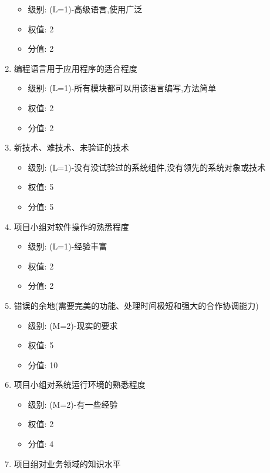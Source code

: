 \documentclass[hyperref, a4paper]{ctexart}
\providecommand{\tightlist}{%
  \setlength{\itemsep}{0pt}\setlength{\parskip}{0pt}}
\begin{document}
\begin{enumerate}
  \begin{itemize}
  \tightlist
  \item
    级别: (L=1)-高级语言,使用广泛
  \item
    权值: 2
  \item
    分值: 2
  \end{itemize}
\item
  编程语言用于应用程序的适合程度

  \begin{itemize}
  \tightlist
  \item
    级别: (L=1)-所有模块都可以用该语言编写,方法简单
  \item
    权值: 2
  \item
    分值: 2
  \end{itemize}
\item
  新技术、难技术、未验证的技术

  \begin{itemize}
  \tightlist
  \item
    级别: (L=1)-没有没试验过的系统组件,没有领先的系统对象或技术
  \item
    权值: 5
  \item
    分值: 5
  \end{itemize}
\item
  项目小组对软件操作的熟悉程度

  \begin{itemize}
  \tightlist
  \item
    级别: (L=1)-经验丰富
  \item
    权值: 2
  \item
    分值: 2
  \end{itemize}
\item
  错误的余地(需要完美的功能、处理时间极短和强大的合作协调能力)

  \begin{itemize}
  \tightlist
  \item
    级别: (M=2)-现实的要求
  \item
    权值: 5
  \item
    分值: 10
  \end{itemize}
\item
  项目小组对系统运行环境的熟悉程度

  \begin{itemize}
  \tightlist
  \item
    级别: (M=2)-有一些经验
  \item
    权值: 2
  \item
    分值: 4
  \end{itemize}
\item
  项目组对业务领域的知识水平


\end{enumerate}
\end{document}
